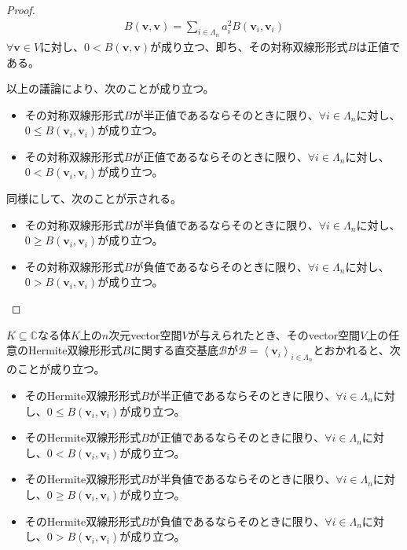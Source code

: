 \documentclass[dvipdfmx]{jsarticle}
\begin{document}
\begin{proof}
\begin{align*}
B\left( \mathbf{v},\mathbf{v} \right) = \sum_{i \in \varLambda_{n}} {a_{i}^{2}B\left( \mathbf{v}_{i},\mathbf{v}_{i} \right)}
\end{align*}
$\forall\mathbf{v} \in V$に対し、$0 < B\left( \mathbf{v},\mathbf{v} \right)$が成り立つ、即ち、その対称双線形形式$B$は正値である。\par
以上の議論により、次のことが成り立つ。
\begin{itemize}
\item
  その対称双線形形式$B$が半正値であるならそのときに限り、$\forall i \in \varLambda_{n}$に対し、$0 \leq B\left( \mathbf{v}_{i},\mathbf{v}_{i} \right)$が成り立つ。
\item
  その対称双線形形式$B$が正値であるならそのときに限り、$\forall i \in \varLambda_{n}$に対し、$0 < B\left( \mathbf{v}_{i},\mathbf{v}_{i} \right)$が成り立つ。
\end{itemize}
同様にして、次のことが示される。
\begin{itemize}
\item
  その対称双線形形式$B$が半負値であるならそのときに限り、$\forall i \in \varLambda_{n}$に対し、$0 \geq B\left( \mathbf{v}_{i},\mathbf{v}_{i} \right)$が成り立つ。
\item
  その対称双線形形式$B$が負値であるならそのときに限り、$\forall i \in \varLambda_{n}$に対し、$0 > B\left( \mathbf{v}_{i},\mathbf{v}_{i} \right)$が成り立つ。
\end{itemize}
\end{proof}
\begin{thm}\label{2.3.5.18}
$K \subseteq \mathbb{C}$なる体$K$上の$n$次元vector空間$V$が与えられたとき、そのvector空間$V$上の任意のHermite双線形形式$B$に関する直交基底$\mathcal{B}$が$\mathcal{B} =\left\langle \mathbf{v}_{i} \right\rangle_{i \in \varLambda_{n}}$とおかれると、次のことが成り立つ。
\begin{itemize}
\item
  そのHermite双線形形式$B$が半正値であるならそのときに限り、$\forall i \in \varLambda_{n}$に対し、$0 \leq B\left( \mathbf{v}_{i},\mathbf{v}_{i} \right)$が成り立つ。
\item
  そのHermite双線形形式$B$が正値であるならそのときに限り、$\forall i \in \varLambda_{n}$に対し、$0 < B\left( \mathbf{v}_{i},\mathbf{v}_{i} \right)$が成り立つ。
\item
  そのHermite双線形形式$B$が半負値であるならそのときに限り、$\forall i \in \varLambda_{n}$に対し、$0 \geq B\left( \mathbf{v}_{i},\mathbf{v}_{i} \right)$が成り立つ。
\item
  そのHermite双線形形式$B$が負値であるならそのときに限り、$\forall i \in \varLambda_{n}$に対し、$0 > B\left( \mathbf{v}_{i},\mathbf{v}_{i} \right)$が成り立つ。
\end{itemize}
\end{thm}
\end{document}
